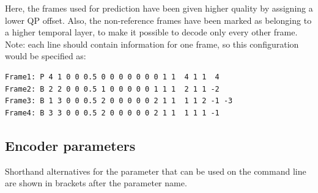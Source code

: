 ﻿\documentclass[a4paper,11pt]{jvetdoc}
\begin{document}
Here, the frames used for prediction have been given higher
quality by assigning a lower QP offset. Also, the non-reference
frames have been marked as belonging to a higher temporal layer,
to make it possible to decode only every other frame. Note: each
line should contain information for one frame, so this
configuration would be specified as:

\begin{verbatim}
Frame1: P 4 1 0 0 0.5 0 0 0 0 0 0 0 1 1  4 1 1  4
Frame2: B 2 2 0 0 0.5 1 0 0 0 0 0 1 1 1  2 1 1 -2
Frame3: B 1 3 0 0 0.5 2 0 0 0 0 0 2 1 1  1 1 2 -1 -3
Frame4: B 3 3 0 0 0.5 2 0 0 0 0 0 2 1 1  1 1 1 -1
\end{verbatim}




\subsection{Encoder parameters}

Shorthand alternatives for the parameter that can be used on the command line are shown in brackets after the parameter name.
\end{document}
